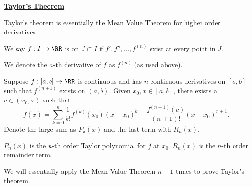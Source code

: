 
\noindent\underline{\textbf{Taylor's Theorem}}
\begin{remark}
Taylor's theorem is essentially the Mean Value Theorem for higher order derivatives.
\end{remark}

\begin{definition}
We say $f: I\to \RR$ is  on $J\subset I$ if $f', f'', \dots, f^{(n)}$ exist at every point in $J.$
\end{definition}

\begin{notation}
We denote the $n$-th derivative of $f$ as $f^{(n)}$ (as used above).
\end{notation}

\begin{theorem}[Taylor]
Suppose $f:[a,b]\to \RR$ is continuous and has $n$ continuous derivatives on $[a,b]$ such that $f^{(n+1)}$ exists on $(a,b).$ Given $x_0,x\in [a,b]$, there exists a $c\in (x_0,x)$ such that 
\[
f(x) = \sum_{k=0}^n \frac{1}{k!}f^{(k)}(x_0)(x-x_0)^k + \frac{f^{(n+1)}(c)}{(n+1)!}(x-x_0)^{n+1}.
\]
Denote the large sum as $P_n(x)$ and the last term with $R_n(x)$.
\end{theorem}

\begin{definition}
$P_n(x)$ is the $n$-th order Taylor polynomial for $f$ at $x_0$. $R_n(x)$ is the $n$-th order remainder term.
\end{definition}

We will essentially apply the Mean Value Theorem $n+1$ times to prove Taylor's theorem.


